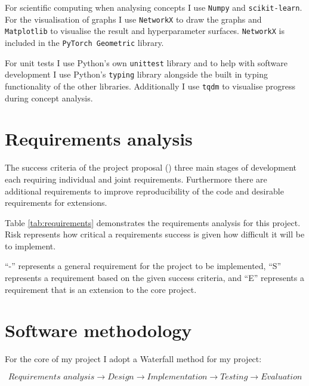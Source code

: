 For scientific computing when analysing concepts I use \texttt{Numpy} and \texttt{scikit-learn}\cite{scikit-learn}. For the visualisation of graphs I use \texttt{NetworkX}\cite{SciPyProceedings_11} to draw the graphs and \texttt{Matplotlib}\cite{Hunter:2007} to visualise the result and hyperparameter surfaces. \texttt{NetworkX} is included in the \texttt{PyTorch Geometric} library.

For unit tests I use Python's own \texttt{unittest} library and to help with software development I use Python's \texttt{typing} library alongside the built in typing functionality of the other libraries. Additionally I use \texttt{tqdm}\cite{casper_da_costa_luis_2023_7697295} to visualise progress during concept analysis.

\section{Requirements analysis}


The success criteria of the project proposal () three main stages of development each requiring individual and joint requirements.
Furthermore there are additional requirements to improve reproducibility of the code and desirable requirements for extensions.

Table \ref{tab:requirements} demonstrates the requirements analysis for this project.
Risk represents how critical a requirements success is given how difficult it will be to implement.

``-'' represents a general requirement for the project to be implemented, ``S'' represents a requirement based on the given success criteria, and ``E'' represents a requirement that is an extension to the core project.



\section{Software methodology}


For the core of my project I adopt a Waterfall method \cite{royce1970managing} for my project:

\begin{equation*}
    \textit{Requirements analysis} \longrightarrow \textit{Design} \longrightarrow \textit{Implementation} \longrightarrow \textit{Testing} \longrightarrow \textit{Evaluation}
\end{equation*}

